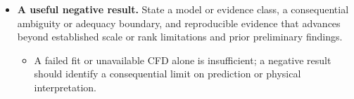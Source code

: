 \begin{itemize}[leftmargin=*]
\begin{itemize}
\item State which kind of contribution each work package would establish and what evidence separates it from implementation or a retrospective fit.
\end{itemize}
\item {}\textbf{A useful negative result.} State a model or evidence class, a consequential ambiguity or adequacy boundary, and reproducible evidence that advances beyond established scale or rank limitations and prior preliminary findings.
\begin{itemize}
\item A failed fit or unavailable CFD alone is insufficient; a negative result should identify a consequential limit on prediction or physical interpretation.
\end{itemize}
\end{itemize}

